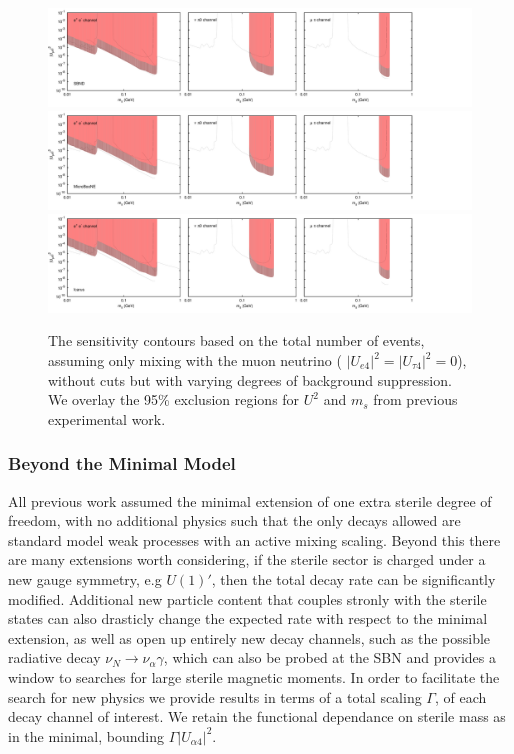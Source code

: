 \documentclass[11pt, a4paper]{article}
\begin{document}
\begin{figure}[t]
\center
\includegraphics[width=1.0\textwidth,clip,trim=0 20 300 15]{figures/sbnd_all_panels_um4.pdf}
\includegraphics[width=1.0\textwidth,clip,trim=0 20 300 15]{figures/muboone_all_panels_um4.pdf}
\includegraphics[width=1.0\textwidth,clip,trim=0 20 300 15]{figures/icarus_all_panels_um4.pdf}

\caption{\label{fig:no_cuts_scaled_bkg_um4_only}The sensitivity contours based on the total
number of events, assuming only mixing with the muon neutrino ( $\vert U_{e 4}\vert^2=\vert U_{\tau 4}\vert^2=0$), without cuts but with varying degrees of background
suppression. We overlay the 95\% exclusion regions for $U^2$ and $m_s$ from
previous experimental work.}

\end{figure}


\subsubsection{Beyond the Minimal Model}

All previous work assumed the minimal extension of one extra sterile degree of
freedom, with no additional physics such that the only decays allowed are
standard model weak processes with an active mixing scaling. Beyond this there
are many extensions worth considering, if the sterile sector is charged under a
new gauge symmetry, e.g $U(1)'$, then the total decay rate can be significantly
modified. Additional new particle content that couples stronly with the sterile
states can also drasticly change the expected rate with respect to the minimal
extension, as well as open up entirely new decay channels, such as the possible
radiative decay $\nu_N \rightarrow \nu_\alpha \gamma$, which can also be probed
at the SBN and provides a window to searches for large sterile magnetic
moments. In order to facilitate the search for new physics we provide results
in terms of a total scaling $\Gamma$, of each decay channel of interest. We
retain the functional dependance on sterile mass as in the minimal, bounding
$\Gamma \vert U_{\alpha 4}\vert^2$. \\
\end{document}
